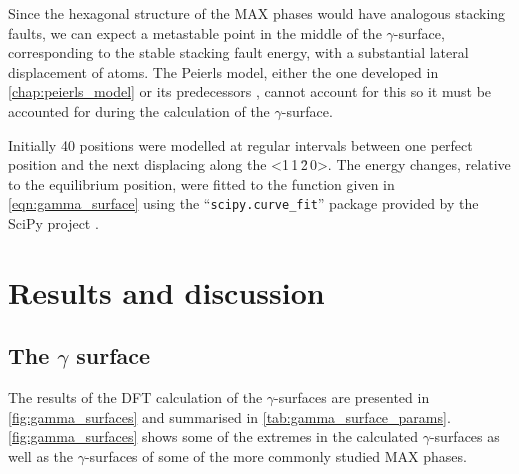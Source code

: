 Since the hexagonal structure of the MAX phases would have analogous stacking faults, we can expect a metastable point in the middle of the $\gamma$-surface, corresponding to the stable stacking fault energy, with a substantial lateral displacement of atoms. The Peierls model, either the one developed in \autoref{chap:peierls_model} or its predecessors \cite{Clegg2006, Howie2017}, cannot account for this so it must be accounted for during the calculation of the $\gamma$-surface.

Initially 40 positions were modelled at regular intervals between one perfect position and the next displacing along the <1\,1\,\={2}\,0>. The energy changes, relative to the equilibrium position, were fitted to the function given in \autoref{eqn:gamma_surface} using the ``\texttt{scipy.curve\_fit}'' package provided by the SciPy project \cite{SciPy2001}.





\section{Results and discussion}

\subsection{The \texorpdfstring{$\gamma$}{gamma} surface}
The results of the DFT calculation of the $\gamma$-surfaces are presented in \autoref{fig:gamma_surfaces} and summarised in \autoref{tab:gamma_surface_params}. \autoref{fig:gamma_surfaces} shows some of the extremes in the calculated $\gamma$-surfaces as well as the $\gamma$-surfaces of some of the more commonly studied MAX phases. 


